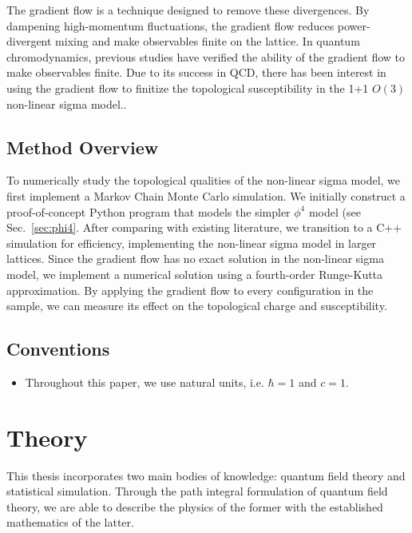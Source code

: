 \documentclass[12pt]{report}
\newcommand{\citeneeded}{}
\begin{document}
The gradient flow is a technique designed to remove these divergences. By dampening high-momentum fluctuations, the gradient flow reduces power-divergent mixing and make observables finite on the lattice.\cite{monahan2016} In quantum chromodynamics, previous studies have verified the ability of the gradient flow to make observables finite\citeneeded. Due to its success in QCD, there has been interest in using the gradient flow to finitize the topological susceptibility in the 1+1 $O(3)$ non-linear sigma model.\cite{bietenholz2018}.


\section{Method Overview}

To numerically study the topological qualities of the non-linear sigma model, we first implement a Markov Chain Monte Carlo simulation. We initially construct a proof-of-concept Python program that models the simpler $\phi^4$ model (see Sec.~\ref{sec:phi4}. After comparing with existing literature, we transition to a C++ simulation for efficiency, implementing the non-linear sigma model in larger lattices. Since the gradient flow has no exact solution in the non-linear sigma model, we implement a numerical solution using a fourth-order Runge-Kutta approximation. By applying the gradient flow to every configuration in the sample, we can measure its effect on the topological charge and susceptibility.




\section{Conventions}
\begin{itemize}
    \item Throughout this paper, we use natural units, i.e. $\hbar = 1$ and $c=1$.
\end{itemize}


\chapter{Theory}

This thesis incorporates two main bodies of knowledge: quantum field theory and statistical simulation. Through the path integral formulation of quantum field theory, we are able to describe the physics of the former with the established mathematics of the latter.
\end{document}
